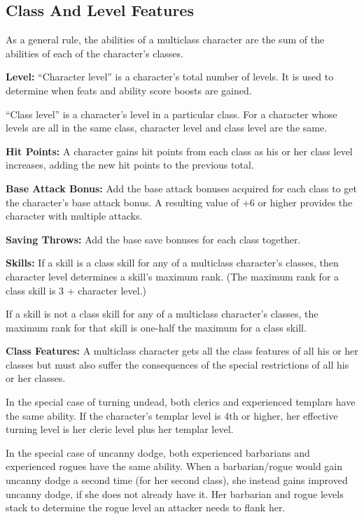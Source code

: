 \subsection{Class And Level Features}
As a general rule, the abilities of a multiclass character are the sum of the abilities of each of the character's classes.

\textbf{Level:} ``Character level'' is a character's total number of levels. It is used to determine when feats and ability score boosts are gained.

``Class level'' is a character's level in a particular class. For a character whose levels are all in the same class, character level and class level are the same.

\textbf{Hit Points:} A character gains hit points from each class as his or her class level increases, adding the new hit points to the previous total.

\textbf{Base Attack Bonus:} Add the base attack bonuses acquired for each class to get the character's base attack bonus. A resulting value of +6 or higher provides the character with multiple attacks.

\textbf{Saving Throws:} Add the base save bonuses for each class together.

\textbf{Skills:} If a skill is a class skill for any of a multiclass character's classes, then character level determines a skill's maximum rank. (The maximum rank for a class skill is 3 + character level.)

If a skill is not a class skill for any of a multiclass character's classes, the maximum rank for that skill is one-half the maximum for a class skill.

\textbf{Class Features:} A multiclass character gets all the class features of all his or her classes but must also suffer the consequences of the special restrictions of all his or her classes.

In the special case of turning undead, both clerics and experienced templars have the same ability. If the character's templar level is 4th or higher, her effective turning level is her cleric level plus her templar level.

In the special case of uncanny dodge, both experienced barbarians and experienced rogues have the same ability. When a barbarian/rogue would gain uncanny dodge a second time (for her second class), she instead gains improved uncanny dodge, if she does not already have it. Her barbarian and rogue levels stack to determine the rogue level an attacker needs to flank her.

